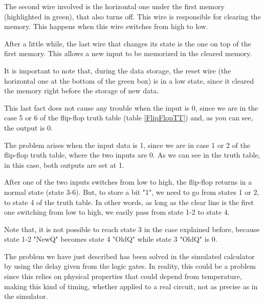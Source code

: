 \documentclass{article}
\begin{document}
\vspace{3mm}

The second wire involved is the horizontal one under the first memory (highlighted in green), that also turns off. This wire is responsible for clearing the memory. This happens when this wire switches from high to low.

\vspace{3mm}

After a little while, the last wire that changes its state is the one on top of the first memory. This allows a new input to be memorized in the cleared memory.

\vspace{3mm}

It is important to note that, during the data storage, the reset wire (the horizontal one at the bottom of the green box) is in a low state, since it cleared the memory right before the storage of new data.

\vspace{3mm}

This last fact does not cause any trouble when the input is 0, since we are in the case 5 or 6 of the flip-flop truth table (table \ref{FlipFlopTT}) and, as you can see, the output is 0. 

\vspace{3mm}

The problem arises when the input data is 1, since we are in case 1 or 2 of the flip-flop truth table, where the two inputs are 0. As we can see in the truth table, in this case, both outputs are set at 1.

\vspace{3mm}

After one of the two inputs switches from low to high, the flip-flop returns in a normal state (state 3-6). But, to store a bit "1", we need to go from states 1 or 2, to state 4 of the truth table. In other words, as long as the clear line is the first one switching from low to high, we easily pass from state 1-2 to state 4.

\vspace{3mm}

Note that, it is not possible to reach state 3 in the case explained before, because state 1-2 "NewQ" becomes state 4 "OldQ" while state 3 "OldQ" is 0.

\vspace{3mm}

The problem we have just described has been solved in the simulated calculator by using the delay given from the logic gates. In reality, this could be a problem since this relies on physical properties that could depend from temperature, making this kind of timing, whether applied to a real circuit, not as precise as in the simulator.
\end{document}
